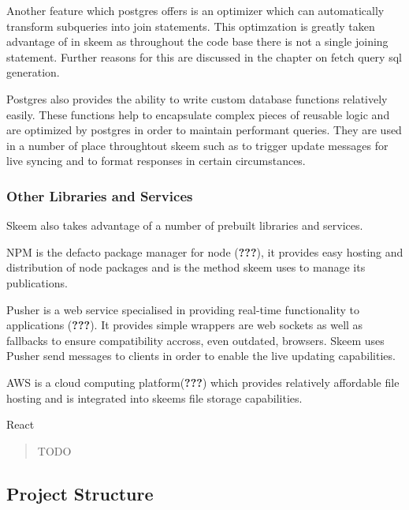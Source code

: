 \documentclass[
  12pt,
]{article}
\providecommand{\tightlist}{%
  \setlength{\itemsep}{0pt}\setlength{\parskip}{0pt}}
\begin{document}
Another feature which postgres offers is an optimizer which can
automatically transform subqueries into join statements. This
optimzation is greatly taken advantage of in skeem as throughout the
code base there is not a single joining statement. Further reasons for
this are discussed in the chapter on fetch query sql generation.

Postgres also provides the ability to write custom database functions
relatively easily. These functions help to encapsulate complex pieces of
reusable logic and are optimized by postgres in order to maintain
performant queries. They are used in a number of place throughtout skeem
such as to trigger update messages for live syncing and to format
responses in certain circumstances.

\hypertarget{other-libraries-and-services}{%
\subsubsection{Other Libraries and
Services}\label{other-libraries-and-services}}

Skeem also takes advantage of a number of prebuilt libraries and
services.

\begin{description}
\tightlist
\item[NPM]
NPM is the defacto package manager for node ({\textbf{???}}), it
provides easy hosting and distribution of node packages and is the
method skeem uses to manage its publications.
\item[Pusher]
Pusher is a web service specialised in providing real-time functionality
to applications ({\textbf{???}}). It provides simple wrappers are web
sockets as well as fallbacks to ensure compatibility accross, even
outdated, browsers. Skeem uses Pusher send messages to clients in order
to enable the live updating capabilities.
\item[Amazon Web Services]
AWS is a cloud computing platform({\textbf{???}}) which provides
relatively affordable file hosting and is integrated into skeems file
storage capabilities.
\item[React]
React
\end{description}

\begin{quote}
TODO
\end{quote}

\hypertarget{project-structure}{%
\subsection{Project Structure}\label{project-structure}}
\end{document}

